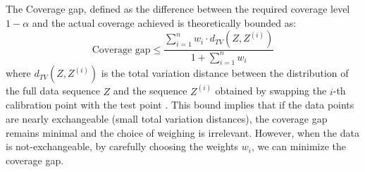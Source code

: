The Coverage gap, defined as the difference between the required coverage level $1 - \alpha$ and the actual coverage achieved is theoretically bounded as:
\begin{equation}
\text{Coverage gap} \leq \frac{\sum_{i=1}^n w_i \cdot d_{TV}(Z, Z^{(i)})}{1 + \sum_{i=1}^n w_i}
\end{equation}
where $d_{TV}(Z, Z^{(i)})$ is the total variation distance between the distribution of the full data sequence $Z$ and the sequence $Z^{(i)}$ obtained by swapping the $i$-th calibration point with the test point \cite{barber2022conformal}. This bound implies that if the data points are nearly exchangeable (small total variation distances), the coverage gap remains minimal and the choice of weighing is irrelevant. However, when the data is not-exchangeable, by carefully choosing the weights $w_i$, we can minimize the coverage gap.
